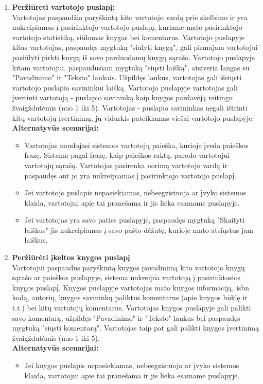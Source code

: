 \documentclass{VUMIFPSkursinis}
\begin{document}
\begin{enumerate}[label=\textbf{U\arabic*.}]
\begin{itemize}
				\end{itemize}
			\item \textbf{Peržiūreti vartotojo puslapį;}\\
				Vartotojas paspaudžia paryškintą kito vartotojo vardą prie skelbimo ir yra nukreipiamas į pasirinktojo vartotojo puslapį, kuriame mato pasirinktojo vartotojo statistiką, siūlomas knygas bei komentarus. 
				Vartotojo puslapyje kitas vartotojas, paspaudęs mygtuką "siulyti knygą", gali pirmajam vartotojui pasiūlyti pirkti knygą iš savo parduodamų knygų sąrašo.
				Vartotojo puslapyje kitam vartotojui, paspaudusiam mygtuką "siųsti laišką", atsiveria langas su "Pavadinimo" ir "Teksto" laukais. Užpildęs laukus, vartotojas gali išsiųsti vartotojo puslapio savininkui laišką. 
				Vartotojo puslapyje vartotojas gali įvertinti vartotoją - puslapio savininką kaip knygos pardavėją reitingu žvaigždutėmis (nuo 1 iki 5).
				Vartotojas - puslapio savininkas negali ištrinti kitų vartotojų įvertinimų, jų vidurkis pateikiamas viešai vartotojo puslapyje.\\
				\textbf{Alternatyvūs scenarijai:}
				\begin{itemize}
					\item Vartotojas naudojasi sistemos vartotojų paieška, kurioje įveda paieškos frazę. Sistema pagal frazę, kaip paieškos raktą, parodo vartotojui vartotojų sąrašą.  Vartotojas pasirenka norimą vartotojo vardą ir paspaudęs ant jo yra nukreipiamas į pasirinktojo vartotojo puslapį.
					\item Jei vartotojo puslapis nepasiekiamas, nebeegzistuoja ar įvyko sistemos klaida, vartotojui apie tai pranešama ir jis lieka esamame puslapyje.
					\item Jei vartotojas yra savo paties puslapyje, paspaudęs mygtuką "Skaityti laiškus" jis nukreipiamas į savo pašto dėžutę, kurioje mato atsiųstus jam laiškus.
				\end{itemize}
			\item \textbf{Peržiūrėti įkeltos knygos puslapį}\\
				Vartotojui paspaudus paryškintą knygos pavadinimą kito vartotojo knygų sąrašo ar paieškos puslapyje, sistema nukreipia vartotoją į pasirinktosios knygos puslapį.
				Knygos puslapyje vartotojas mato knygos informaciją, isbn kodą, autorių, knygos savininkų paliktus komentarus (apie knygos būklę ir t.t.) bei kitų vartotojų komentarus.
				Vartotojas knygos puslapyje gali palikti savo komentarą, užpildęs "Pavadinimo" ir "Teksto" laukus bei paspaudęs mygtuką "siųsti komentarą". Vartotojas taip pat gali palikti knygos įvertinimą žvaigždutėmis (nuo 1 iki 5).\\
				\textbf{Alternatyvūs scenarijai:}
				\begin{itemize}
					\item Jei knygos puslapis nepasiekiamas, nebeegzistuoja ar įvyko sistemos klaida, vartotojui apie tai pranešama ir jis lieka esamame puslapyje.
				\end{itemize}


\end{enumerate}
\end{document}
